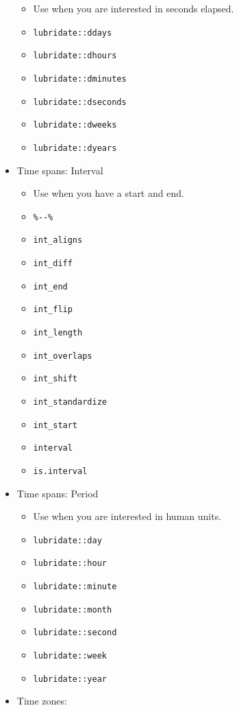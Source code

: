 \documentclass[
]{book}
\providecommand{\tightlist}{%
  \setlength{\itemsep}{0pt}\setlength{\parskip}{0pt}}
\begin{document}
\begin{itemize}
  \begin{itemize}
  \tightlist
  \item
    Use when you are interested in seconds elapsed.
  \item
    \texttt{lubridate::ddays}
  \item
    \texttt{lubridate::dhours}
  \item
    \texttt{lubridate::dminutes}
  \item
    \texttt{lubridate::dseconds}
  \item
    \texttt{lubridate::dweeks}
  \item
    \texttt{lubridate::dyears}
  \end{itemize}
\item
  Time spans: Interval

  \begin{itemize}
  \tightlist
  \item
    Use when you have a start and end.
  \item
    \texttt{\%-\/-\%}
  \item
    \texttt{int\_aligns}
  \item
    \texttt{int\_diff}
  \item
    \texttt{int\_end}
  \item
    \texttt{int\_flip}
  \item
    \texttt{int\_length}
  \item
    \texttt{int\_overlaps}
  \item
    \texttt{int\_shift}
  \item
    \texttt{int\_standardize}
  \item
    \texttt{int\_start}
  \item
    \texttt{interval}
  \item
    \texttt{is.interval}
  \end{itemize}
\item
  Time spans: Period

  \begin{itemize}
  \tightlist
  \item
    Use when you are interested in human units.
  \item
    \texttt{lubridate::day}
  \item
    \texttt{lubridate::hour}
  \item
    \texttt{lubridate::minute}
  \item
    \texttt{lubridate::month}
  \item
    \texttt{lubridate::second}
  \item
    \texttt{lubridate::week}
  \item
    \texttt{lubridate::year}
  \end{itemize}
\item
  Time zones:


\end{itemize}
\end{document}
